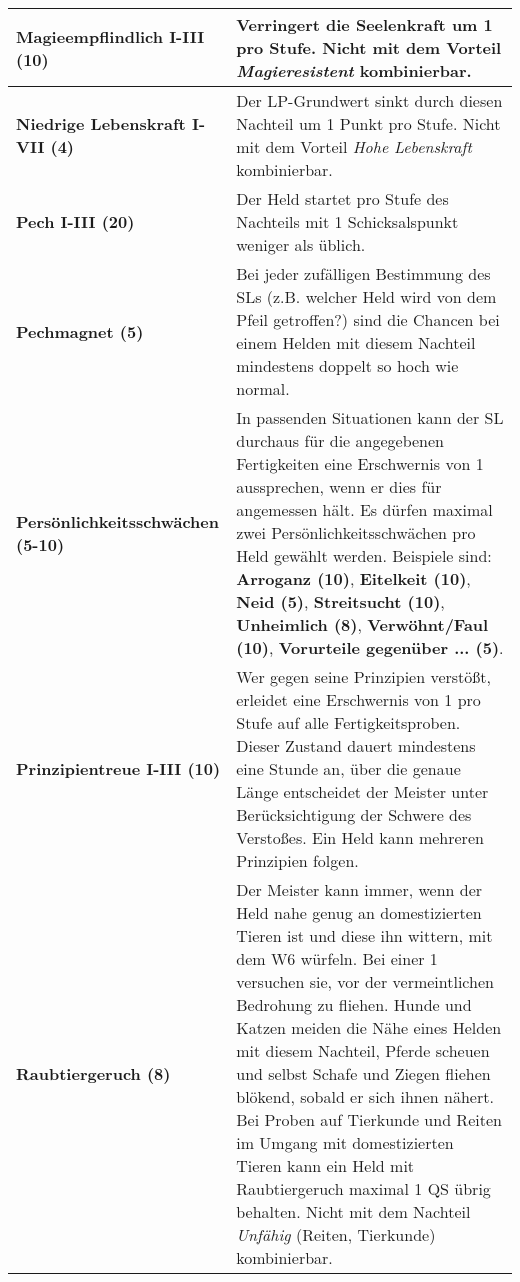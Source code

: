 \begin{longtable}{|p{5cm}|p{11cm}|}
\textbf{Magieempflindlich I-III (10)} & Verringert die Seelenkraft um 1 pro Stufe. Nicht mit dem Vorteil \textit{Magieresistent} kombinierbar. \\ \hline

\textbf{Niedrige Lebenskraft I-VII (4)} & Der LP-Grundwert sinkt durch diesen Nachteil um 1 Punkt pro Stufe. Nicht mit dem Vorteil \textit{Hohe Lebenskraft} kombinierbar. \\ \hline

\textbf{Pech I-III (20)} & Der Held startet pro Stufe des Nachteils mit 1 Schicksalspunkt weniger als üblich. \\ \hline

\textbf{Pechmagnet (5)} & Bei jeder zufälligen Bestimmung des SLs (z.B. welcher Held wird von dem Pfeil getroffen?) sind die Chancen bei einem Helden mit diesem Nachteil mindestens doppelt so hoch wie normal. \\ \hline

\textbf{Persönlichkeitsschwächen (5-10)} & In passenden Situationen kann der SL durchaus für die angegebenen Fertigkeiten eine Erschwernis von 1 aussprechen, wenn er dies für angemessen hält. Es dürfen maximal zwei Persönlichkeitsschwächen pro Held gewählt werden. Beispiele sind: \textbf{Arroganz (10)}, \textbf{Eitelkeit (10)}, \textbf{Neid (5)}, \textbf{Streitsucht (10)}, \textbf{Unheimlich (8)}, \textbf{Verwöhnt/Faul (10)}, \textbf{Vorurteile gegenüber ... (5)}. \\ \hline

\textbf{Prinzipientreue I-III (10)} & Wer gegen seine Prinzipien verstößt, erleidet eine Erschwernis von 1 pro Stufe auf alle Fertigkeitsproben. Dieser Zustand dauert mindestens eine Stunde an, über die genaue Länge entscheidet der Meister unter Berücksichtigung der Schwere des Verstoßes. Ein Held kann mehreren Prinzipien folgen. \\ \hline

\textbf{Raubtiergeruch (8)} & Der Meister kann immer, wenn der Held nahe genug an domestizierten Tieren ist und diese ihn wittern, mit dem W6 würfeln. Bei einer 1 versuchen sie, vor der vermeintlichen Bedrohung zu fliehen. Hunde und Katzen meiden die Nähe eines Helden mit diesem Nachteil, Pferde scheuen und selbst Schafe und Ziegen fliehen blökend, sobald er sich ihnen nähert. Bei Proben auf Tierkunde und Reiten im Umgang mit domestizierten Tieren kann ein Held mit Raubtiergeruch maximal 1 QS übrig behalten. Nicht mit dem Nachteil  \textit{Unfähig} (Reiten, Tierkunde) kombinierbar. \\ \hline


\end{longtable}
